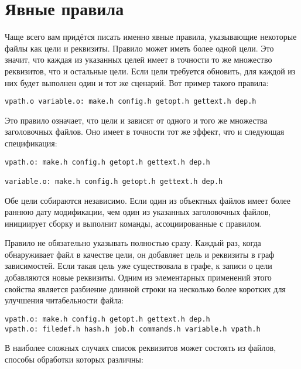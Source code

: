 \section{Явные правила}
\label{sec:explicit_rules}

Чаще всего вам придётся писать именно явные правила, указывающие
некоторые файлы как цели и реквизиты. Правило может иметь более одной
цели. Это значит, что каждая из указанных целей имеет в точности то же
множество реквизитов, что и остальные цели. Если цели требуется
обновить, для каждой из них будет выполнен один и тот же сценарий. Вот
пример такого правила:

{\footnotesize
\begin{verbatim}
vpath.o variable.o: make.h config.h getopt.h gettext.h dep.h
\end{verbatim}
}

Это правило означает, что цели  и
 зависят от одного и того же множества
заголовочных файлов. Оно имеет в точности тот же эффект, что и
следующая спецификация:

{\footnotesize
\begin{verbatim}
vpath.o: make.h config.h getopt.h gettext.h dep.h

variable.o: make.h config.h getopt.h gettext.h dep.h
\end{verbatim}
}

Обе цели собираются независимо. Если один из объектных файлов имеет
более раннюю дату модификации, чем один из указанных заголовочных
файлов, \GNUmake{} инициирует сборку и выполнит команды,
ассоциированные с правилом.

Правило не обязательно указывать полностью сразу. Каждый раз, когда
\GNUmake{} обнаруживает файл в качестве цели, он добавляет цель и
реквизиты в граф зависимостей. Если такая цель уже существовала в
графе, к записи о цели добавляются новые реквизиты. Одним из
элементарных применений этого свойства является разбиение длинной
строки на несколько более коротких для улучшения читабельности файла:

{\footnotesize
\begin{verbatim}
vpath.o: make.h config.h getopt.h gettext.h dep.h
vpath.o: filedef.h hash.h job.h commands.h variable.h vpath.h
\end{verbatim}
}

В наиболее сложных случаях список реквизитов может состоять из файлов, способы
обработки которых различны:

